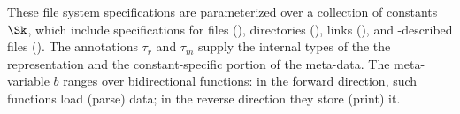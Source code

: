 
These file system specifications are parameterized over a collection
of constants $\Sk$, which include specifications for files (\pfile),
directories (\pdir), links (\plink), and \padshaskell{}-described
files (). The annotations $\tau_r$ and $\tau_m$ supply the
internal types of the the representation and the constant-specific
portion of the meta-data. The meta-variable $b$ ranges over
bidirectional functions: in the forward direction, such functions load
(parse) data; in the reverse direction they store (print) it.

